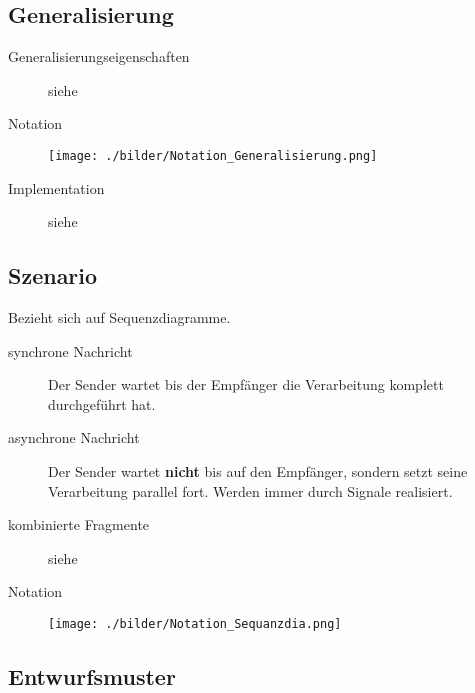 \subsection{Generalisierung }
  \begin{description}
    \item[Generalisierungseigenschaften]
      siehe 
    \item[Notation]
      \parbox{15cm}{\texttt{[image: ./bilder/Notation\_Generalisierung.png]}}
    \item[Implementation]
      siehe 
  \end{description}
  

\subsection{Szenario }
  Bezieht sich auf Sequenzdiagramme.
  \begin{description}
    \item[synchrone Nachricht]
      Der Sender wartet bis der Empfänger die Verarbeitung komplett durchgeführt hat.
    \item[asynchrone Nachricht]
      Der Sender wartet \textbf{nicht} bis auf den Empfänger, sondern setzt seine Verarbeitung parallel fort. Werden immer durch Signale realisiert.
    \item[kombinierte Fragmente]
      siehe 
    \item[Notation]
      \parbox{15cm}{\texttt{[image: ./bilder/Notation\_Sequanzdia.png]}}
  \end{description}
  
\subsection{Entwurfsmuster }